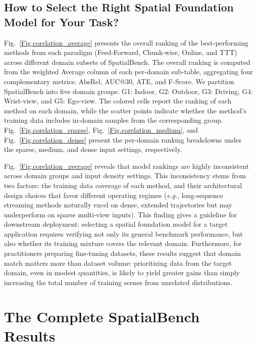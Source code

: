 \documentclass{llmxive}
\providecommand{\benchmark}{SpatialBench\xspace}
\begin{document}
\subsection{How to Select the Right Spatial Foundation Model for Your Task?}
%
Fig.~\ref{Fig.corelation_average} presents the overall ranking of the best-performing methods from each paradigm (Feed-Forward, Chunk-wise, Online, and TTT) across different domain subsets of \benchmark.
%
The overall ranking is computed from the weighted Average column of each per-domain sub-table, aggregating four complementary metrics: AbsRel, AUC@30, ATE, and F-Score.
%
We partition \benchmark into five domain groups: G1: Indoor, G2: Outdoor, G3: Driving, G4: Wrist-view, and G5: Ego-view.
%
The colored cells report the ranking of each method on each domain, while the scatter points indicate whether the method's training data includes in-domain samples from the corresponding group.
%
Fig.~\ref{Fig.corelation_sparse}, Fig.~\ref{Fig.corelation_medium}, and Fig.~\ref{Fig.corelation_dense} present the per-domain ranking breakdowns under the sparse, medium, and dense input settings, respectively.

Fig.~\ref{Fig.corelation_average} reveals that model rankings are highly 
inconsistent across domain groups and input density settings.
%
This inconsistency stems from two factors: the training data coverage of each method, and their architectural design choices that favor different operating regimes (\emph{e.g.}, long-sequence streaming methods naturally excel on dense, 
extended trajectories but may underperform on sparse multi-view inputs).
%
This finding gives a guideline for downstream deployment: selecting a spatial foundation model for a target application requires verifying not only its general benchmark performance, but also whether its training mixture covers the relevant domain.
%
Furthermore, for practitioners preparing fine-tuning datasets, these results suggest that domain match matters more than dataset volume: prioritizing data from the target domain, even in modest quantities, is likely to yield greater gains than simply increasing the total number of training scenes from unrelated distributions.
%


\section{The Complete \benchmark Results}
\label{appendix:completeresults}
\end{document}
